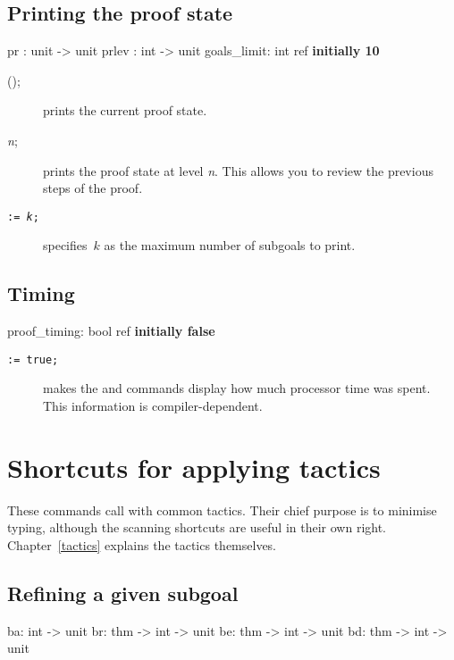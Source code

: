 \subsection{Printing the proof state}
\begin{ttbox} 
pr    : unit -> unit
prlev : int -> unit
goals_limit: int ref \hfill{\bf initially 10}
\end{ttbox}
\begin{description}
\item[();] 
prints the current proof state.

\item[ {\it n};] 
prints the proof state at level {\it n}.  This allows you to review the
previous steps of the proof.

\item[ \tt:= {\it k};] 
specifies~$k$ as the maximum number of subgoals to print.
\end{description}


\subsection{Timing}
\begin{ttbox} 
proof_timing: bool ref \hfill{\bf initially false}
\end{ttbox}

\begin{description}
\item[ \tt:= true;] 
makes the  and  commands display how much
processor time was spent.  This information is compiler-dependent.
\end{description}


\section{Shortcuts for applying tactics}
These commands call  with common tactics.  Their chief purpose
is to minimise typing, although the scanning shortcuts are useful in their
own right.  Chapter~\ref{tactics} explains the tactics themselves.

\subsection{Refining a given subgoal}
\begin{ttbox} 
ba: int -> unit
br: thm -> int -> unit
be: thm -> int -> unit
bd: thm -> int -> unit
\end{ttbox}

